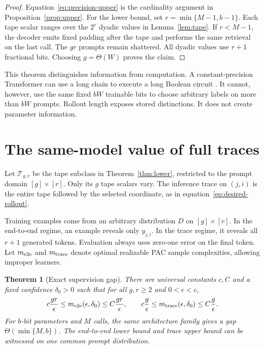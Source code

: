 \documentclass{article}
\newtheorem{theorem}{Theorem}
\newcommand{\1}{\mathbf 1}
\begin{document}
\begin{proof}
Equation~\eqref{eq:precision-upper} is the cardinality argument in
Proposition~\ref{prop:upper}. For the lower bound, set
$r=\min\{M-1,b-1\}$. Each tape scalar ranges over the $2^r$ dyadic values in
Lemma~\ref{lem:tape}. If $r<M-1$, the decoder emits fixed padding after the tape and performs the
same retrieval on the last call. The $gr$ prompts remain shattered. All dyadic values use $r+1$
fractional bits. Choosing $g=\Theta(W)$ proves the claim.
\end{proof}

This theorem distinguishes information from computation. A constant-precision Transformer can
use a long chain to execute a long Boolean circuit \citep{li2024serial}. It cannot, however, use
the same fixed $bW$ trainable bits to choose arbitrary labels on more than $bW$ prompts. Rollout
length exposes stored distinctions. It does not create parameter information.

\section{The same-model value of full traces}

Let $\mathcal T_{g,r}$ be the tape subclass in Theorem~\ref{thm:lower}, restricted to the prompt
domain $[g]\times[r]$. Only its $g$ tape scalars vary. The inference trace on $(j,i)$ is the entire
tape followed by the selected coordinate, as in equation~\eqref{eq:desired-rollout}.

Training examples come from an arbitrary distribution $D$ on $[g]\times[r]$. In the end-to-end
regime, an example reveals only $y_{j,i}$. In the trace regime, it reveals all $r+1$ generated
tokens. Evaluation always uses zero-one error on the final token. Let $m_{\rm e2e}$ and
$m_{\rm trace}$ denote optimal realizable PAC sample complexities, allowing improper learners.

\begin{theorem}[Exact supervision gap]\label{thm:gap}
There are universal constants $c,C$ and a fixed confidence $\delta_0>0$ such that for all
$g,r\geq2$ and $0<\epsilon<c$,
\begin{equation}
 c\frac{gr}{\epsilon}
 \leq m_{\rm e2e}(\epsilon,\delta_0)
 \leq C\frac{gr}{\epsilon},
 \qquad
 c\frac{g}{\epsilon}
 \leq m_{\rm trace}(\epsilon,\delta_0)
 \leq C\frac{g}{\epsilon}.
 \label{eq:gap}
\end{equation}
For $b$-bit parameters and $M$ calls, the same architecture family gives a gap
$\Theta(\min\{M,b\})$.
The end-to-end lower bound and trace upper bound can be witnessed on one common prompt
distribution.
\end{theorem}
\end{document}
